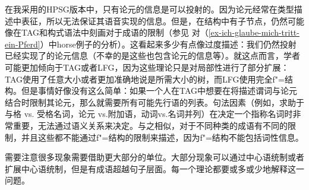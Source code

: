 在我采用的HPSG版本中，只有论元的信息是可以投射的。因为论元经常在类型描述中表征，所以无法保证其语音实现的信息。但是，在结构中有子节点，仍然可能像在TAG和构式语法中刻画对于成语的限制（参见 对（\ref{ex-ich-glaube-mich-tritt-ein-Pferd}）中horse例子的分析）。这看起来多少有点像过度描述：我们仍然投射已经实现了的论元信息（不幸的是这些也包含论元的信息等）。就这点而言，学者可能更加倾向于TAG或者LFG，因为这些理论只是对局部性进行了部分扩展：TAG使用了任意大小或者更加准确地说是所需大小的树，而LFG使用完全f"=结构。但是事情好像没有这么简单：如果一个人在TAG中想要在将描述谓词与论元结合时限制其论元，那么就需要所有可能先行语的列表。句法因素（例如，求助于与格 vs. 受格名词，论元 vs.附加语，动词vs.名词并列）在决定一个指称名词时非常重要，无法通过语义关系来决定。与之相似，对于不同种类的成语有不同的限制，并且这些都不能通过f"=结构的限制来描述，因为f"=结构不能包括词性信息。

需要注意很多现象需要借助更大部分的单位。大部分现象可以通过中心语统制或者扩展中心语统制，但是有成语超越句子层面。每一个理论都要或多或少地解释这一问题。




